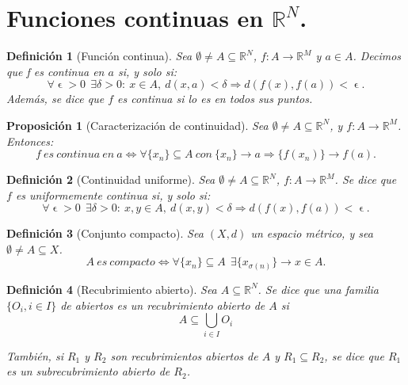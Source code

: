 \documentclass[11pt, a4paper, titlepage]{article}
\let\epsilon\upvarepsilon
\theoremstyle{theorem-style}
\newtheorem*{nprop}{Proposición}
\theoremstyle{definition-style}
\newtheorem*{ndef}{Definición}
\theoremstyle{remark-style}
\theoremstyle{example-style}
\begin{document}
\newpage


\section{Funciones continuas en $\mathbb{R}^N$.}



\begin{ndef}[Función continua]
Sea $\emptyset \ne A\subseteq \mathbb{R}^N$, $f: A \longrightarrow \mathbb{R}^M$ y $a \in A$. Decimos que \textit{f es continua en $a$} si, y solo si: $$\forall \epsilon > 0\ \ \exists \delta > 0: \ x\in A, \ d(x,a)<\delta \Rightarrow d(f(x),f(a))<\epsilon.$$
Además, se dice que $f$ es continua si lo es en todos sus puntos.	
\end{ndef}



\begin{nprop}[Caracterización de continuidad]
Sea $\emptyset \ne A \subseteq \mathbb{R}^N$, y $f:A\longrightarrow \mathbb{R}^M$. Entonces: $$f\ es\ continua\ en\ a \iff \forall \{x_n\}\subseteq A\ con\ \{x_n\} \rightarrow a \Rightarrow \{f(x_n)\} \rightarrow f(a).$$
\end{nprop}



\begin{ndef}[Continuidad uniforme]
Sea $\emptyset \ne A \subseteq \mathbb{R}^N$, $f:A \longrightarrow \mathbb{R}^M$. Se dice que $f$ es uniformemente continua si, y solo si: $$\forall \epsilon > 0 \ \ \exists \delta > 0 : \ x,y \in A,\ d(x,y) < \delta \Rightarrow d(f(x),f(a)) < \epsilon.$$
\end{ndef}


\begin{ndef}[Conjunto compacto]
Sea $(X,d)$ un espacio métrico, y sea $\emptyset \ne A \subseteq X$. $$A\ es\ compacto \iff \forall \{x_n\} \subseteq A\ \ \exists \{x_{\sigma(n)}\} \rightarrow x\in A.$$
\end{ndef}

\begin{ndef}[Recubrimiento abierto]
	Sea $A \subseteq \mathbb{R}^N$. Se dice que una familia $\{O_i, i\in I\}$ de abiertos es un \emph{recubrimiento abierto} de $A$ si
	\[
		A \subseteq \bigcup_{i\in I} O_i
	\]
	
	También, si $R_1$ y $R_2$ son recubrimientos abiertos de $A$ y $R_1 \subseteq R_2$, se dice que $R_1$ es un \emph{subrecubrimiento abierto} de $R_2$.
\end{ndef}
\end{document}
